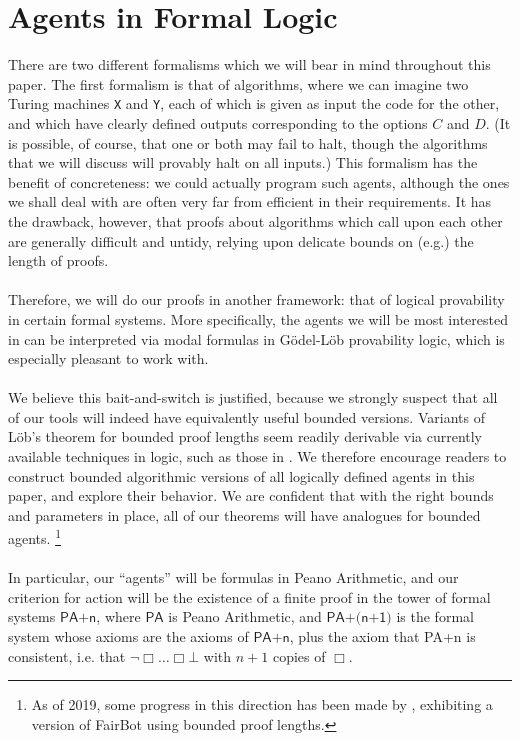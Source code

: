 \documentclass[12pt, letterpaper]{article}
\numberwithin{equation}{section}
\begin{document}
\section{Agents in Formal Logic}
\label{formal}
There are two different formalisms which we will bear in mind throughout this paper. The first formalism is that of algorithms, where we can imagine two Turing machines \texttt{X} and \texttt{Y}, each of which is given as input the code for the other, and which have clearly defined outputs corresponding to the options $C$ and $D$. (It is possible, of course, that one or both may fail to halt, though the algorithms that we will discuss will provably halt on all inputs.) This formalism has the benefit of concreteness: we could actually program such agents, although the ones we shall deal with are often very far from efficient in their requirements. It has the drawback, however, that proofs about algorithms which call upon each other are generally difficult and untidy, relying upon delicate bounds on (e.g.) the length of proofs.
\\
\\ Therefore, we will do our proofs in another framework: that of logical provability in certain formal systems. More specifically, the agents we will be most interested in can be interpreted via modal formulas in G\"{o}del-L\"{o}b provability logic, which is especially pleasant to work with. 
\\
\\ We believe this bait-and-switch is justified, because we strongly suspect that all of our tools will indeed have equivalently useful bounded versions.  Variants of L\"{o}b's theorem for bounded proof lengths seem readily derivable via currently available techniques in logic, such as those in \cite{Pudlak}.  We therefore encourage readers to construct bounded algorithmic versions of all logically defined agents in this paper, and explore their behavior.  We are confident that with the right bounds and parameters in place, all of our theorems will have analogues for bounded agents. \footnote{As of 2019, some progress in this direction has been made by \cite{Critch}, exhibiting a version of FairBot using bounded proof lengths.}
\\
\\ In particular, our ``agents'' will be formulas in Peano Arithmetic, and our criterion for action will be the existence of a finite proof in the tower of formal systems $\textsf{PA+n}$, where $\textsf{PA}$ is Peano Arithmetic, and $\textsf{PA+(n+1)}$ is the formal system whose axioms are the axioms of $\textsf{PA+n}$, plus the axiom that \textsf{PA+n} is consistent, i.e. that $\neg\Box\dots\Box\bot$ with $n+1$ copies of $\Box$.
\end{document}
